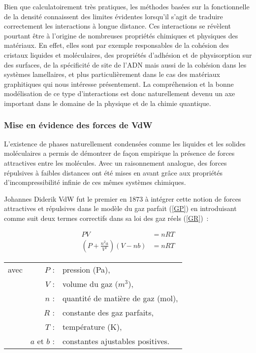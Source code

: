 Bien que calculatoirement très pratiques, les méthodes basées sur la fonctionnelle de la densité connaissent des limites évidentes lorsqu'il s'agit de traduire correctement les interactions à longue distance. Ces interactions se révèlent pourtant être à l'origine de nombreuses propriétés chimiques et physiques des matériaux. En effet, elles sont par exemple responsables de la cohésion des cristaux liquides et moléculaires, des propriétés d'adhésion et de physisorption sur des surfaces, de la spécificité de site de l'ADN mais aussi de la cohésion dans les systèmes lamellaires, et plus particulièrement dans le cas des matériaux graphitiques qui nous intéresse présentement. La compréhension et la bonne modélisation de ce type d'interactions est donc naturellement devenu un axe important dans le domaine de la physique et de la chimie quantique. 



\subsubsection{Mise en évidence des forces de VdW}

L'existence de phases naturellement condensées comme les liquides et les solides moléculaires a permis de démontrer de façon empirique la présence de forces attractives entre les molécules. Avec un raisonnement analogue, des forces répulsives à faibles distances ont été mises en avant grâce aux propriétés d'incompressibilité infinie de ces mêmes systèmes chimiques.

Johannes Diderik VdW fut le premier en 1873 à intégrer cette notion de forces attractives et répulsives dans le modèle du \og gaz parfait \fg{} (\ref*{GP}) en introduisant comme suit deux termes correctifs dans sa loi des \og gaz réels \fg{} (\ref*{GR})~:

\begin{align}
PV &= nRT \label{GP} \\
\left(P+\frac{n^{2}a}{V^{2}}\right)(V-nb) &= nRT \label{GR}
\end{align}

\begin{flushleft}
\begin{tabular}{@{}lrp{10cm}}
avec & $P$ : & pression (Pa), \\
& $V$ : & volume du gaz ($m^{3}$), \\    %
& $n$ : & quantité de matière de gaz (mol), \\
& $R$ : & constante des gaz parfaits, \\
& $T$ : & température (K), \\
& $a$ et $b$ : & constantes ajustables positives. 
\end{tabular}
\end{flushleft}

